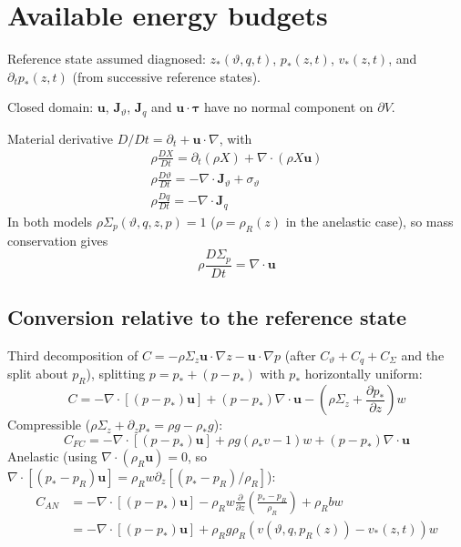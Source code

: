 \documentclass{article}
\begin{document}
\section{Available energy budgets}
Reference state assumed diagnosed: \(z_*(\vartheta, q, t)\), \(p_*(z, t)\), \(v_*(z, t)\), and \(\partial_t p_*(z, t)\) (from successive reference states).

Closed domain: \(\mathbf{u}\), \(\mathbf{J}_\vartheta\), \(\mathbf{J}_q\) and \(\mathbf{u}\cdot \boldsymbol{\tau}\) have no normal component on \(\partial V\).

Material derivative \(D/Dt = \partial_t + \mathbf{u}\cdot \nabla\), with
\begin{gather}
    \rho \frac{D X}{D t}
    =
    \partial_t (\rho X)
    + \nabla\cdot (\rho X \mathbf{u})
    \\
    \rho \frac{D \vartheta}{D t}
    =
    - \nabla \cdot \mathbf{J}_\vartheta
    + \sigma_\vartheta
    \\
    \rho \frac{D q}{D t}
    =
    - \nabla \cdot \mathbf{J}_q
\end{gather}
In both models \(\rho \Sigma_p(\vartheta, q, z, p) = 1\) (\(\rho = \rho_R(z)\) in the anelastic case), so mass conservation gives
\begin{equation}
    \rho \frac{D \Sigma_p}{D t}
    =
    \nabla \cdot \mathbf{u}
\end{equation}

\subsection{Conversion relative to the reference state}
Third decomposition of \(C = - \rho \Sigma_z \mathbf{u} \cdot \nabla z - \mathbf{u} \cdot \nabla p\) (after \(C_\vartheta + C_q + C_\Sigma\) and the split about \(p_R\)), splitting \(p = p_* + (p - p_*)\) with \(p_*\) horizontally uniform:
\begin{equation}
    C
    =
    - \nabla \cdot \left[ (p - p_*) \mathbf{u} \right]
    + (p - p_*) \nabla \cdot \mathbf{u}
    - \left( \rho \Sigma_z + \frac{\partial p_*}{\partial z} \right) w
\end{equation}
Compressible (\(\rho \Sigma_z + \partial_z p_* = \rho g - \rho_* g\)):
\begin{equation}
    C_{FC}
    =
    - \nabla \cdot \left[ (p - p_*) \mathbf{u} \right]
    + \rho g (\rho_* v - 1) w
    + (p - p_*) \nabla \cdot \mathbf{u}
\end{equation}
Anelastic (using \(\nabla \cdot (\rho_R \mathbf{u}) = 0\), so \(\nabla \cdot \left[ (p_* - p_R) \mathbf{u} \right] = \rho_R w \partial_z \left[ (p_* - p_R) / \rho_R \right]\)):
\begin{align}
    C_{AN}
    & =
    - \nabla \cdot \left[ (p - p_*) \mathbf{u} \right]
    - \rho_R w \frac{\partial}{\partial z} \left( \frac{p_* - p_R}{\rho_R} \right)
    + \rho_R b w
    \\
    & =
    - \nabla \cdot \left[ (p - p_*) \mathbf{u} \right]
    + \rho_R g \rho_R \left( v(\vartheta, q, p_R(z)) - v_*(z, t) \right) w
\end{align}
\end{document}
